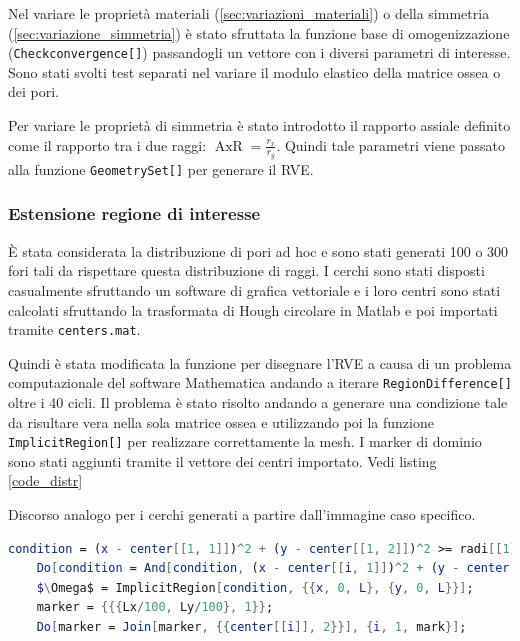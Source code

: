 \documentclass[a4paper,num-refs]{oup-contemporary}
\begin{document}
Nel variare le proprietà materiali (\cref{sec:variazioni_materiali}) o della simmetria (\cref{sec:variazione_simmetria}) è stato sfruttata la funzione base di omogenizzazione (\texttt{Checkconvergence[]}) passandogli un vettore con i diversi parametri di interesse. Sono stati svolti test separati nel variare il modulo elastico della matrice ossea o dei pori.

Per variare le proprietà di simmetria è stato introdotto il rapporto assiale definito come il rapporto tra i due raggi: $\operatorname{AxR}=\frac{r_{x}}{r_y}$. 
Quindi tale parametri viene passato alla funzione \texttt{GeometrySet[]} per generare il RVE. 



\subsubsection{Estensione regione di interesse}

È stata considerata la distribuzione di pori ad hoc e sono stati generati 100 o 300 fori tali da rispettare questa distribuzione di raggi. I cerchi sono stati disposti casualmente sfruttando un software di grafica vettoriale e i loro centri sono stati calcolati sfruttando la trasformata di Hough circolare in Matlab \citep{Hough} e poi importati tramite \texttt{centers.mat}.

Quindi è stata modificata la funzione per disegnare l'RVE a causa di un problema computazionale del software Mathematica andando a iterare \texttt{RegionDifference[]} oltre i 40 cicli. Il problema è stato risolto andando a generare una condizione tale da risultare vera nella sola matrice ossea e utilizzando poi la funzione \texttt{ImplicitRegion[]} per realizzare correttamente la mesh. I marker di dominio sono stati aggiunti tramite il vettore dei centri importato. Vedi  listing \ref{code_distr}

Discorso analogo per i cerchi generati a partire dall'immagine caso specifico.


\begin{lstlisting}[language=Mathematica,caption=Generazione RVE importando raggi e centri,label=code_distr]
	condition = (x - center[[1, 1]])^2 + (y - center[[1, 2]])^2 >= radi[[1]]^2  && (x - center[[2, 1]])^2 + (y - center[[2, 2]])^2 >= radi[[2]]^2
	Do[condition = And[condition, (x - center[[i, 1]])^2 + (y - center[[i, 2]])^2 >= radi[[i]]^2];, {i, 1, mark}];
	$\Omega$ = ImplicitRegion[condition, {{x, 0, L}, {y, 0, L}}];
	marker = {{{Lx/100, Ly/100}, 1}};
	Do[marker = Join[marker, {{center[[i]], 2}}], {i, 1, mark}];
\end{lstlisting}
\end{document}
